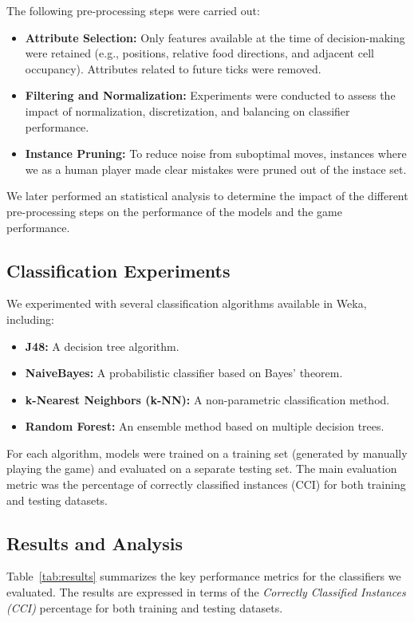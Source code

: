 \documentclass[12pt,a4paper]{article}
\begin{document}
The following pre-processing steps were carried out:
\begin{itemize}
    \item \textbf{Attribute Selection:} Only features available at the time of decision-making were retained (e.g., positions, relative food directions, and adjacent cell occupancy). Attributes related to future ticks were removed.
    \item \textbf{Filtering and Normalization:} Experiments were conducted to assess the impact of normalization, discretization, and balancing on classifier performance.
    \item \textbf{Instance Pruning:} To reduce noise from suboptimal moves, instances where we as a human player made clear mistakes were pruned out of the instace set.
\end{itemize}

We later performed an statistical analysis to determine the impact of the different pre-processing steps on the performance of the models and the game performance.

\subsection{Classification Experiments}
We experimented with several classification algorithms available in Weka, including:
\begin{itemize}
    \item \textbf{J48:} A decision tree algorithm.
    \item \textbf{NaiveBayes:} A probabilistic classifier based on Bayes' theorem.
    \item \textbf{k-Nearest Neighbors (k-NN):} A non-parametric classification method.
    \item \textbf{Random Forest:} An ensemble method based on multiple decision trees.
\end{itemize}

For each algorithm, models were trained on a training set (generated by manually playing the game) and evaluated on a separate testing set. The main evaluation metric was the percentage of correctly classified instances (CCI) for both training and testing datasets.

\subsection{Results and Analysis}
Table~\ref{tab:results} summarizes the key performance metrics for the classifiers we evaluated. The results are expressed in terms of the \textit{Correctly Classified Instances (CCI)} percentage for both training and testing datasets.
\end{document}
